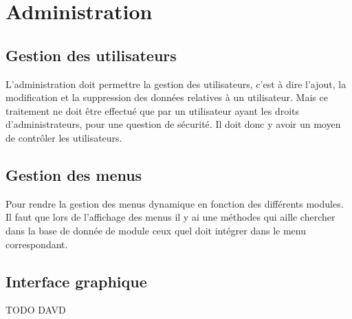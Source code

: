 \section{Administration}

\subsection{Gestion des utilisateurs}

L'administration doit permettre la gestion des utilisateurs, c'est à dire l'ajout, la modification et la suppression des données relatives à un utilisateur. Mais ce traitement ne doit être effectué que par un utilisateur ayant les droits d'administrateurs, pour une question de sécurité. Il doit donc y avoir un moyen de contrôler les utilisateurs.

\subsection{Gestion des menus}
Pour rendre la gestion des menus dynamique en fonction des différents modules. Il faut que lors de l'affichage des menus il y ai une méthodes qui aille chercher dans la base de donnée de module ceux quel doit intégrer dans le menu correspondant.

\subsection{Interface graphique}
TODO DAVD